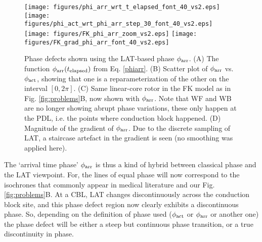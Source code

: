 \documentclass[aps,pre,amsfonts,amssymb,amsmath,twocolumn, superscriptaddress]{revtex4-1}
\newcommand{\phiact}{\ensuremath{\phi_{\rm act}}}
\newcommand{\phiarr}{\ensuremath{\phi_{\rm arr}}}
\newcommand{\tlap}{\ensuremath{t_{\rm elapsed}}}
\begin{document}
\begin{figure*}
    \centering
{}    \texttt{[image: figures/phi\_arr\_wrt\_t\_elapsed\_font\_40\_vs2.eps]}
    \texttt{[image: figures/phi\_act\_wrt\_phi\_arr\_step\_30\_font\_40\_vs2.eps]} \\
    \texttt{[image: figures/FK\_phi\_arr\_zoom\_vs2.eps]}
    \texttt{[image: figures/FK\_grad\_phi\_arr\_font\_40\_vs2.eps]}
     \caption{Phase defects shown using the LAT-based phase $\phiarr$. (A) The function $\phiarr(\tlap)$ from Eq. \eqref{phiarr}. (B) Scatter plot of $\phiarr$ vs. $\phiact$, showing that one is a reparameterization of the other on the interval $[0, 2\pi]$. (C) Same linear-core rotor in the FK model as in Fig. \ref{fig:problems}B, now shown with $\phiarr$. Note that WF and WB are no longer showing abrupt phase variations, these only happen at the PDL, i.e. the points where conduction block happened. (D) Magnitude of the gradient of $\phiarr$. Due to the discrete sampling of LAT, a staircase artefact in the gradient is seen (no smoothing was applied here). 
    }
    \label{fig:phiarr}
\end{figure*}

The `arrival time phase' $\phiarr$ is thus a kind of hybrid between classical phase and the LAT viewpoint. For, the lines of equal phase will now correspond to the isochrones that commonly appear in medical literature and our Fig. \ref{fig:problems}B. At a CBL, LAT changes discontinuously across the conduction block site, and this phase defect region now clearly exhibits a discontinuous phase. So, depending on the definition of phase used ($\phiact$ or $\phiarr$ or another one) the phase defect will be either a steep but continuous phase transition, or a true discontinuity in phase. 
\end{document}
